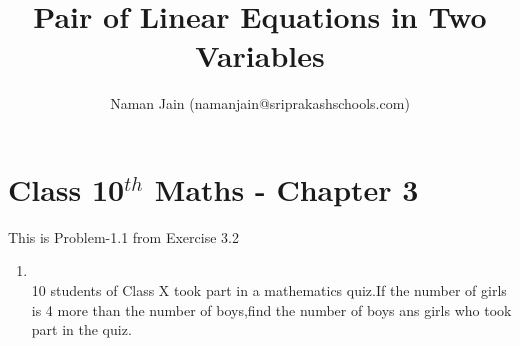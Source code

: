 \documentclass[10pt]{article}
\title{Pair of Linear Equations in Two Variables}
\author{Naman Jain  (namanjain@sriprakashschools.com)}
\begin{document}
\maketitle
\section*{Class 10$^{th}$ Maths - Chapter 3}
This is Problem-1.1 from Exercise 3.2
\begin{enumerate}
\item  \\ 10 students of Class X took part in a mathematics quiz.If the number of girls is 4 more than the number of boys,find the number of boys ans girls who took part in the quiz.
	

\end{enumerate}
\end{document}
